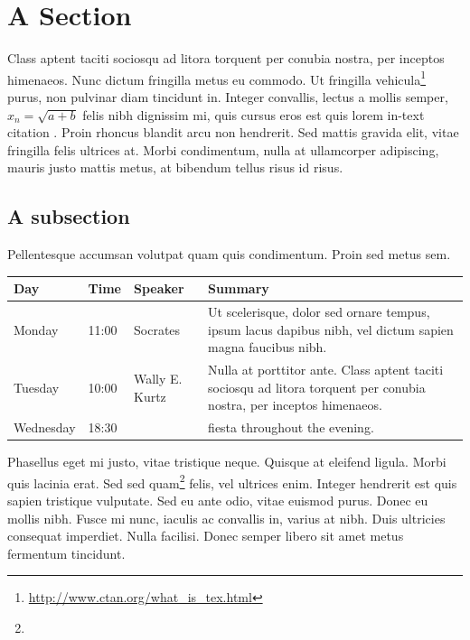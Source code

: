 \documentclass[12pt,a4paper]{article}
\begin{document}
\newpage
\section{A Section}
\label{sec:1}

Class aptent taciti sociosqu ad litora torquent per conubia nostra,
per inceptos himenaeos. Nunc dictum fringilla metus eu commodo.  Ut
fringilla
vehicula\footnote{\url{http://www.ctan.org/what_is_tex.html}} purus,
non pulvinar diam tincidunt in. Integer convallis, lectus a mollis
semper, $x_n = \sqrt{a + b}$ felis nibh dignissim mi, quis cursus eros
est quis lorem in-text citation \cite[p.\ 19]{Abook2011}.  Proin
rhoncus blandit arcu non hendrerit. Sed mattis gravida elit, vitae
fringilla felis ultrices at. Morbi condimentum, nulla at ullamcorper
adipiscing, mauris justo mattis metus, at bibendum tellus risus id
risus.

\subsection{A subsection}
\label{sec:1-1}

Pellentesque accumsan volutpat quam quis condimentum. Proin sed metus
sem.

\begin{center}
  \begin{tabular}{ | l | l | l | p{5cm} |}
    \hline
    Day & Time & Speaker & Summary \\ \hline
    Monday & 11:00 & Socrates &  Ut scelerisque, dolor sed
    ornare tempus, ipsum lacus dapibus nibh, vel dictum sapien magna
    faucibus nibh. \\ \hline
    Tuesday & 10:00 & Wally E. Kurtz & Nulla at porttitor ante. Class aptent taciti sociosqu ad litora torquent per conubia nostra, per inceptos himenaeos. \\ \hline
    Wednesday & 18:30 & &  fiesta throughout the evening. \\
    \hline
    \end{tabular}
\end{center}

Phasellus eget mi justo, vitae tristique neque. Quisque at eleifend
ligula. Morbi quis lacinia erat. Sed sed
quam\footnote{} felis, vel ultrices
enim. Integer hendrerit est quis sapien tristique vulputate. Sed eu
ante odio, vitae euismod purus. Donec eu mollis nibh. Fusce mi nunc,
iaculis ac convallis in, varius at nibh. Duis ultricies consequat
imperdiet. Nulla facilisi. Donec semper libero sit amet metus
fermentum tincidunt.
\end{document}
